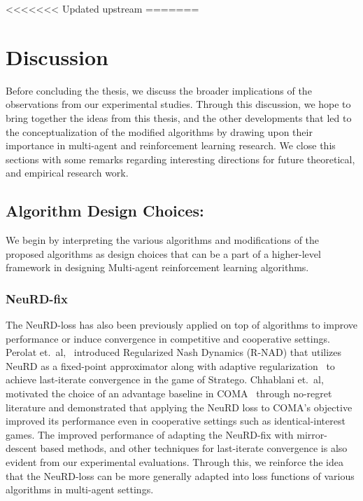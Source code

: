 <<<<<<< Updated upstream
=======
\chapter{Discussion}

Before concluding the thesis, we discuss the broader implications of the observations from our
experimental studies.
Through this discussion, we hope to bring together the ideas from this thesis, and the other
developments that led to the conceptualization of the modified algorithms by drawing upon their
importance in multi-agent and reinforcement learning research.
We close this sections with some remarks regarding interesting directions for future theoretical,
and empirical research work.

\section{Algorithm Design Choices:}
We begin by interpreting the various algorithms and modifications of the proposed algorithms as
design choices that can be a part of a higher-level framework in designing Multi-agent
reinforcement learning algorithms.

\subsection{NeuRD-fix}
The NeuRD-loss has also been previously applied on top of algorithms to improve performance or
induce convergence in competitive and cooperative settings.
Perolat et.~al,~\cite{perolatMastering2022} introduced Regularized Nash Dynamics (R-NAD) that
utilizes NeuRD as a fixed-point approximator along with adaptive
regularization~\cite{perolatPoincare2021} to achieve last-iterate convergence in the game of
Stratego.
Chhablani et.~al,~\cite{chhablaniCounterfactual2021} motivated the choice of an advantage baseline
in COMA~\cite{foersterCounterfactual2018} through no-regret literature and demonstrated that
applying the NeuRD loss to COMA's objective improved its performance even in cooperative settings
such as identical-interest games.
The improved performance of adapting the NeuRD-fix with mirror-descent based methods, and other
techniques for last-iterate convergence is also evident from our experimental evaluations.
Through this, we reinforce the idea that the NeuRD-loss can be more generally adapted into loss
functions of various algorithms in multi-agent settings.

